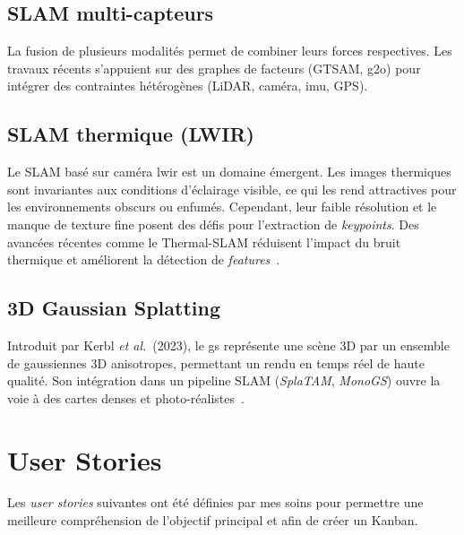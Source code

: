 \documentclass[12pt,a4paper]{report}
\begin{document}
\section{SLAM multi-capteurs}

La fusion de plusieurs modalités permet de combiner leurs forces respectives.
Les travaux récents s'appuient sur des graphes de facteurs (GTSAM, g2o) pour
intégrer des contraintes hétérogènes (LiDAR, caméra, \acrshort{imu}, GPS).

\section{SLAM thermique (LWIR)}

Le SLAM basé sur caméra \acrshort{lwir} est un domaine émergent. Les images
thermiques sont invariantes aux conditions d'éclairage visible, ce qui les rend
attractives pour les environnements obscurs ou enfumés. Cependant, leur faible
résolution et le manque de texture fine posent des défis pour l'extraction de
\emph{keypoints}. Des avancées récentes comme le Thermal-SLAM réduisent
l'impact du bruit thermique et améliorent la détection de
\emph{features}~\cite{wu2023thermalslam}.

\section{3D Gaussian Splatting}

Introduit par Kerbl \emph{et al.}~(2023), le \acrfull{gs} représente une scène
3D par un ensemble de gaussiennes 3D anisotropes, permettant un rendu en temps
réel de haute qualité. Son intégration dans un pipeline SLAM (\emph{SplaTAM},
\emph{MonoGS}) ouvre la voie à des cartes denses et
photo-réalistes~\cite{kerbl2023gaussian}.

\chapter{User Stories}

Les \emph{user stories} suivantes ont été définies par mes soins pour permettre
une meilleure compréhension de l'objectif principal et afin de créer un Kanban.
\end{document}
